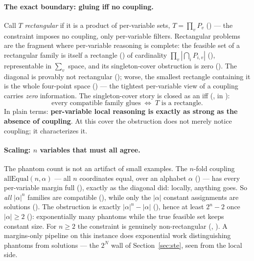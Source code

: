 \documentclass[11pt]{article}
\begin{document}
\paragraph{The exact boundary: gluing iff no coupling.}  Call $T$
\emph{rectangular} if it is a product of per-variable sets, $T =
\prod_v P_v$ () --- the constraint imposes no
coupling, only per-variable filters.  Rectangular problems are the
fragment where per-variable reasoning is complete: the feasible set
of a rectangular family is itself a rectangle
() of cardinality $\prod_v
|{\bigcap_i P_{i,v}}|$ (), representable in
$\sum_v$ space, and its singleton-cover obstruction is zero
().  The diagonal is provably not
rectangular (); worse, the smallest
rectangle containing it is the whole four-point space
() --- the tightest
per-variable view of a coupling carries \emph{zero} information.  The
singleton-cover story is closed as an iff
(, in
):
\[
  \text{every compatible family glues}
  \;\iff\;
  T \text{ is a rectangle.}
\]
In plain terms: \textbf{per-variable local reasoning is exactly as
strong as the absence of coupling}.  At this cover the obstruction
does not merely notice coupling; it characterizes it.

\paragraph{Scaling: $n$ variables that must all agree.}  The phantom
count is not an artifact of small examples.  The $n$-fold coupling
$\mathrm{allEqual}(n, \alpha)$ --- all $n$ coordinates equal, over an
alphabet $\alpha$ () --- has every per-variable margin
full (), exactly as the diagonal did:
locally, anything goes.  So \emph{all} $|\alpha|^n$ families are
compatible (), while only
the $|\alpha|$ constant assignments are solutions
().  The obstruction is exactly $|\alpha|^n -
|\alpha|$ (), hence at least $2^n - 2$
once $|\alpha| \ge 2$ ():
exponentially many phantoms while the true feasible set keeps
constant size.  For $n \ge 2$ the constraint is genuinely
non-rectangular (,
).  A margins-only pipeline on this
instance does exponential work distinguishing phantoms from solutions
--- the $2^N$ wall of Section~\ref{sec:ste}, seen from the local
side.
\end{document}
